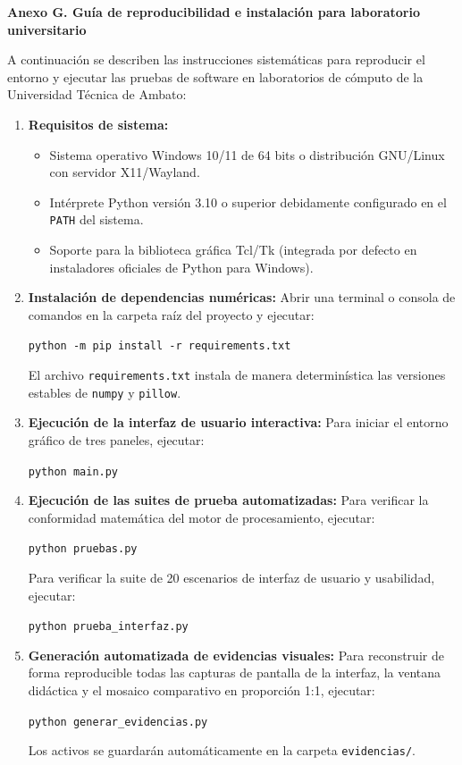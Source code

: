 \documentclass[11pt]{article}
\begin{document}
\textbf{Anexo G. Guía de reproducibilidad e instalación para laboratorio universitario}

A continuación se describen las instrucciones sistemáticas para reproducir el entorno y ejecutar las pruebas de software en laboratorios de cómputo de la Universidad Técnica de Ambato:

\begin{enumerate}[itemsep=0.3em]
\item \textbf{Requisitos de sistema:}
\begin{itemize}[itemsep=0.15em]
\item Sistema operativo Windows 10/11 de 64 bits o distribución GNU/Linux con servidor X11/Wayland.
\item Intérprete Python versión 3.10 o superior debidamente configurado en el \texttt{PATH} del sistema.
\item Soporte para la biblioteca gráfica Tcl/Tk (integrada por defecto en instaladores oficiales de Python para Windows).
\end{itemize}
\item \textbf{Instalación de dependencias numéricas:}
Abrir una terminal o consola de comandos en la carpeta raíz del proyecto y ejecutar:
\begin{center}
\texttt{python -m pip install -r requirements.txt}
\end{center}
El archivo \texttt{requirements.txt} instala de manera determinística las versiones estables de \texttt{numpy} y \texttt{pillow}.

\item \textbf{Ejecución de la interfaz de usuario interactiva:}
Para iniciar el entorno gráfico de tres paneles, ejecutar:
\begin{center}
\texttt{python main.py}
\end{center}

\item \textbf{Ejecución de las suites de prueba automatizadas:}
Para verificar la conformidad matemática del motor de procesamiento, ejecutar:
\begin{center}
\texttt{python pruebas.py}
\end{center}
Para verificar la suite de 20 escenarios de interfaz de usuario y usabilidad, ejecutar:
\begin{center}
\texttt{python prueba\_interfaz.py}
\end{center}

\item \textbf{Generación automatizada de evidencias visuales:}
Para reconstruir de forma reproducible todas las capturas de pantalla de la interfaz, la ventana didáctica y el mosaico comparativo en proporción 1:1, ejecutar:
\begin{center}
\texttt{python generar\_evidencias.py}
\end{center}
Los activos se guardarán automáticamente en la carpeta \texttt{evidencias/}.
\end{enumerate}
\end{document}
